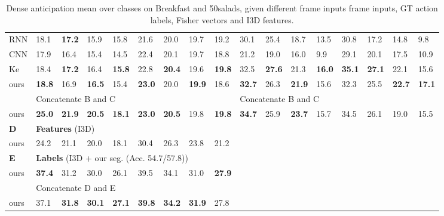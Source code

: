 \documentclass[runningheads]{llncs}
\begin{document}
\begin{table}[t]
{\begin{tabular}{|l|llllllll||llllllll|}
    \rowcolor{red!15}RNN\cite{abu2018will} & 18.1 & \textbf{17.2} & 15.9 & 15.8 & 21.6 & 20.0 & 19.7 & 19.2 & 30.1 & 25.4 & 18.7 & 13.5 & 30.8 & 17.2 & 14.8 & 9.8\\
    \rowcolor{red!15}CNN\cite{abu2018will} & 17.9 & 16.4 & 15.4 & 14.5 & 22.4 & 20.1 & 19.7 & 18.8 & 21.2 & 19.0 & 16.0 & 9.9& 29.1 & 20.1 & 17.5 & 10.9 \\
    \rowcolor{red!15}Ke\cite{Ke_2019_CVPR} & 18.4 & \textbf{17.2} & 16.4 & \textbf{15.8} & 22.8 & \textbf{20.4} & 19.6 & \textbf{19.8} & 32.5 & \textbf{27.6} & 21.3 & \textbf{16.0} & \textbf{35.1} & \textbf{27.1} & 22.1 & 15.6 \\
    \rowcolor{red!15}ours & \textbf{18.8} & 16.9 & \textbf{16.5}& 15.4& \textbf{23.0}& 20.0& \textbf{19.9}& 18.6 & \textbf{32.7} &  26.3 &  \textbf{21.9} &  15.6 &  32.3 & 25.5 &  \textbf{22.7} &  \textbf{17.1} \\ \hline
& \multicolumn{8}{l||}{\cellcolor{red!15} Concatenate B and C}& \multicolumn{8}{l|}{\cellcolor{red!15} Concatenate B and C}\\ \hline
    \rowcolor{red!15} ours& \textbf{25.0} & \textbf{21.9} & \textbf{20.5} & \textbf{18.1} & \textbf{23.0} & \textbf{20.5} & 19.8 &\textbf{19.8} & \textbf{34.7} & 25.9  & \textbf{23.7} &  15.7 & 34.5 & 26.1	& 19.0 &  15.5 \\ \hline
\textbf{D}& \multicolumn{8}{l||}{\cellcolor{blue!15}  \textbf{Features} (I3D)} &&&&&&&&\\
    \cellcolor{blue!15} ours &\cellcolor{blue!15} 24.2 &\cellcolor{blue!15} 21.1 &\cellcolor{blue!15} 20.0	&\cellcolor{blue!15} 18.1	&\cellcolor{blue!15} 30.4	&\cellcolor{blue!15} 26.3	&\cellcolor{blue!15} 23.8	&\cellcolor{blue!15} 21.2 &&&&&&&& \\ \cline{1-9} 
\textbf{E}& \multicolumn{8}{l||}{\cellcolor{blue!15}  \textbf{Labels} (I3D + our seg. (Acc.  54.7/57.8)) } &&&&&&&&\\ 
    \cellcolor{blue!15} ours &\cellcolor{blue!15}    \textbf{37.4}	 &\cellcolor{blue!15}  31.2 &\cellcolor{blue!15}  30.0 &\cellcolor{blue!15} 26.1 &\cellcolor{blue!15} 39.5 &\cellcolor{blue!15}  34.1	 &\cellcolor{blue!15} 31.0	 &\cellcolor{blue!15} \textbf{27.9}    &&&&&&&&\\   \cline{1-9}
    & \multicolumn{8}{l||}{\cellcolor{blue!15} Concatenate D and E} &&&&&&&&\\
    \cellcolor{blue!15} ours&\cellcolor{blue!15} 37.1	&\cellcolor{blue!15} \textbf{31.8}	 &\cellcolor{blue!15} \textbf{30.1}	 &\cellcolor{blue!15} \textbf{27.1}	&\cellcolor{blue!15} \textbf{39.8}	&\cellcolor{blue!15} \textbf{34.2}	 &\cellcolor{blue!15} \textbf{31.9}	&\cellcolor{blue!15} 27.8 &&&&&&&&\\\hline
\end{tabular} }  
\caption{Dense anticipation mean over classes on Breakfast and 50salads, given different frame inputs frame inputs, GT action labels, Fisher vectors and I3D features.}
\label{tab:SOA_dense_breakfast_50salad}
\end{table} 
 
\end{document}
